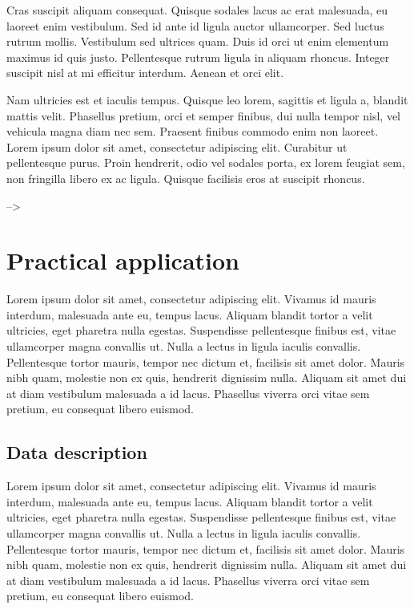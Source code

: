 \documentclass[a4paper, nobind]{templates/ociamthesis}
\theoremstyle{definition}
\theoremstyle{definition}
\theoremstyle{definition}
\theoremstyle{remark}
\begin{document}
Cras suscipit aliquam consequat. Quisque sodales lacus ac erat malesuada, eu laoreet enim vestibulum. Sed id ante id ligula auctor ullamcorper. Sed luctus rutrum mollis. Vestibulum sed ultrices quam. Duis id orci ut enim elementum maximus id quis justo. Pellentesque rutrum ligula in aliquam rhoncus. Integer suscipit nisl at mi efficitur interdum. Aenean et orci elit.

Nam ultricies est et iaculis tempus. Quisque leo lorem, sagittis et ligula a, blandit mattis velit. Phasellus pretium, orci et semper finibus, dui nulla tempor nisl, vel vehicula magna diam nec sem. Praesent finibus commodo enim non laoreet. Lorem ipsum dolor sit amet, consectetur adipiscing elit. Curabitur ut pellentesque purus. Proin hendrerit, odio vel sodales porta, ex lorem feugiat sem, non fringilla libero ex ac ligula. Quisque facilisis eros at suscipit rhoncus.

--\textgreater{}

\hypertarget{chap:practical-app}{%
\chapter{\texorpdfstring{\textbf{Practical application}}{Practical application}}\label{chap:practical-app}}

\minitoc  


Lorem ipsum dolor sit amet, consectetur adipiscing elit. Vivamus id mauris interdum, malesuada ante eu, tempus lacus. Aliquam blandit tortor a velit ultricies, eget pharetra nulla egestas. Suspendisse pellentesque finibus est, vitae ullamcorper magna convallis ut. Nulla a lectus in ligula iaculis convallis. Pellentesque tortor mauris, tempor nec dictum et, facilisis sit amet dolor. Mauris nibh quam, molestie non ex quis, hendrerit dignissim nulla. Aliquam sit amet dui at diam vestibulum malesuada a id lacus. Phasellus viverra orci vitae sem pretium, eu consequat libero euismod.

\hypertarget{data-description}{%
\section{Data description}\label{data-description}}

Lorem ipsum dolor sit amet, consectetur adipiscing elit. Vivamus id mauris interdum, malesuada ante eu, tempus lacus. Aliquam blandit tortor a velit ultricies, eget pharetra nulla egestas. Suspendisse pellentesque finibus est, vitae ullamcorper magna convallis ut. Nulla a lectus in ligula iaculis convallis. Pellentesque tortor mauris, tempor nec dictum et, facilisis sit amet dolor. Mauris nibh quam, molestie non ex quis, hendrerit dignissim nulla. Aliquam sit amet dui at diam vestibulum malesuada a id lacus. Phasellus viverra orci vitae sem pretium, eu consequat libero euismod.
\end{document}
